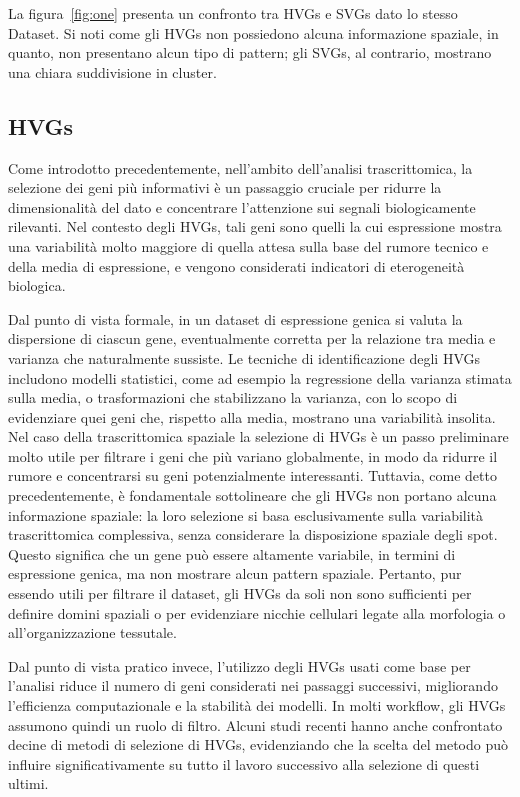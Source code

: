 La figura~\ref{fig:one} presenta un confronto tra HVGs e SVGs dato lo stesso Dataset. Si noti come gli HVGs non possiedono alcuna informazione 
spaziale, in quanto, non presentano alcun tipo di pattern;
gli SVGs, al contrario, mostrano una chiara suddivisione in cluster. 

\subsection{HVGs}\label{sec:HVGs}
Come introdotto precedentemente, nell'ambito dell'analisi trascrittomica, 
la selezione dei geni più informativi è un passaggio cruciale per ridurre la 
dimensionalità del dato e concentrare l'attenzione sui segnali biologicamente rilevanti.
Nel contesto degli HVGs, tali geni sono quelli la cui espressione 
mostra una variabilità molto maggiore di quella attesa sulla base del rumore tecnico 
e della media di espressione, e vengono considerati indicatori di eterogeneità biologica\cite{HVGS}.

Dal punto di vista formale, in un dataset di espressione genica 
si valuta la dispersione di ciascun gene, eventualmente corretta 
per la relazione tra media e varianza che naturalmente sussiste. 
Le tecniche di identificazione degli HVGs includono modelli statistici, come ad esempio la 
regressione della varianza stimata sulla media, o trasformazioni che stabilizzano la varianza, 
con lo scopo di evidenziare quei geni che, rispetto alla media, mostrano una variabilità insolita\cite{HVGS2}.
Nel caso della trascrittomica spaziale la selezione di HVGs è un passo preliminare 
molto utile per filtrare i geni che più variano globalmente, in modo da ridurre il 
rumore e concentrarsi su geni potenzialmente interessanti. 
Tuttavia, come detto precedentemente, è fondamentale sottolineare che gli HVGs 
non portano alcuna informazione spaziale: 
la loro selezione si basa esclusivamente sulla variabilità trascrittomica complessiva, 
senza considerare la disposizione spaziale degli spot.
Questo significa che un gene può essere altamente variabile, in termini di espressione genica, 
ma non mostrare alcun pattern spaziale. 
Pertanto, pur essendo utili per filtrare il dataset, gli HVGs da soli non sono sufficienti 
per definire domini spaziali o per evidenziare nicchie cellulari legate alla morfologia 
o all'organizzazione tessutale.

Dal punto di vista pratico invece, l'utilizzo degli HVGs usati come base per l'analisi 
riduce il numero di geni considerati nei passaggi successivi, 
migliorando l'efficienza computazionale e la stabilità dei modelli. 
In molti workflow, gli HVGs assumono quindi un ruolo di filtro. 
Alcuni studi recenti hanno anche confrontato decine di metodi di selezione di HVGs, 
evidenziando che la scelta del metodo può influire significativamente su tutto il lavoro successivo 
alla selezione di questi ultimi\cite{HVGS3}.

